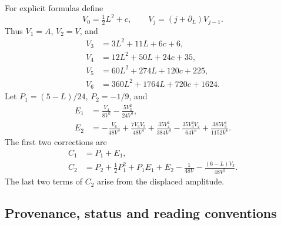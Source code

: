 \documentclass[11pt]{article}
\theoremstyle{definition}
\theoremstyle{plain}
\begin{document}
For explicit formulas define
\begin{equation}\label{shs:eq:Vrec}
 V_0=\tfrac12L^2+c,\qquad V_j=(j+\partial_L)V_{j-1}.
\end{equation}
Thus $V_1=A$, $V_2=V$, and
\begin{align*}
 V_3&=3L^2+11L+6c+6,\\
 V_4&=12L^2+50L+24c+35,\\
 V_5&=60L^2+274L+120c+225,\\
 V_6&=360L^2+1764L+720c+1624.
\end{align*}
Let $P_1=(5-L)/24$, $P_2=-1/9$, and
\begin{align}
 E_1&=\frac{V_4}{8V^2}-\frac{5V_3^2}{24V^3},\label{shs:eq:E1}\\
 E_2&=-\frac{V_6}{48V^3}+\frac{7V_3V_5}{48V^4}
 +\frac{35V_4^2}{384V^4}-\frac{35V_3^2V_4}{64V^5}
 +\frac{385V_3^4}{1152V^6}.\label{shs:eq:E2}
\end{align}
The first two corrections are
\begin{align}
 C_1&=P_1+E_1,\label{shs:eq:C1}\\
 C_2&=P_2+\tfrac12P_1^2+P_1E_1+E_2
       -\frac1{48V}-\frac{(6-L)V_3}{48V^2}.\label{shs:eq:C2}
\end{align}
The last two terms of $C_2$ arise from the displaced amplitude.

\subsection{Provenance, status and reading conventions}\label{shs:provenance}
\end{document}
